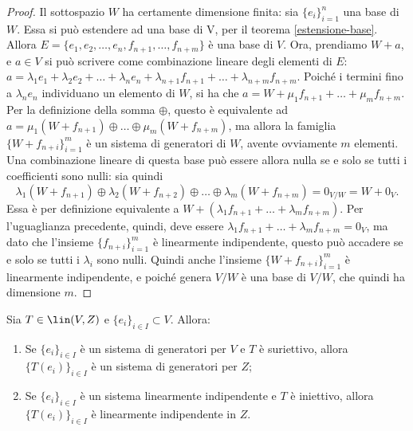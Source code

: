 \begin{proof}
	Il sottospazio $W$ ha certamente dimensione finita: sia $\{  e_i\}_{i=1}^n$ una base di $W$.
	Essa si può estendere ad una base di V, per il teorema \ref{estensione-base}.
	Allora $E=\{  e_1,  e_2,\dots,  e_n,  f_{n+1},\dots,  f_{n+m}\}$ è una base di $V$.
	Ora, prendiamo $W+  a$, e $  a\in V$ si può scrivere come combinazione lineare degli elementi di $E$: $  a=\lambda_1  e_1+\lambda_2  e_2+\dots+\lambda_n  e_n+\lambda_{n+1}  f_{n+1}+\dots+\lambda_{n+m}  f_{n+m}$.
	Poiché i termini fino a $\lambda_n  e_n$ individuano un elemento di $W$, si ha che $a=W+\mu_1  f_{n+1}+\dots+\mu_m  f_{n+m}$.
	Per la definizione della somma $\oplus$, questo è equivalente ad $a=\mu_1(W+  f_{n+1})\oplus\dots\oplus\mu_m(W+  f_{n+m})$, ma allora la famiglia $\{W+  f_{n+i}\}_{i=1}^m$ è un sistema di generatori di $W$, avente ovviamente $m$ elementi.
	Una combinazione lineare di questa base può essere allora nulla se e solo se tutti i coefficienti sono nulli: sia quindi
	\begin{equation*}
		\lambda_1(W+  f_{n+1})\oplus\lambda_2(W+  f_{n+2})\oplus\dots\oplus\lambda_m(W+  f_{n+m})=0_{V/W}=W+0_V.
	\end{equation*}
	Essa è per definizione equivalente a $W+(\lambda_1  f_{n+1}+\dots+\lambda_m  f_{n+m})$.
	Per l'uguaglianza precedente, quindi, deve essere $\lambda_1  f_{n+1}+\dots+\lambda_m  f_{n+m}=0_V$, ma dato che l'insieme $\{  f_{n+i}\}_{i=1}^m$ è linearmente indipendente, questo può accadere se e solo se tutti i $\lambda_i$ sono nulli.
	Quindi anche l'insieme $\{W+  f_{n+i}\}_{i=1}^m$ è linearmente indipendente, e poiché genera $V/W$ è una base di $V/W$, che quindi ha dimensione $m$.
\end{proof}
\begin{teorema}
	Sia $T\in\lin(V,Z)$ e $\{  e_i\}_{i\in I}\subset V$.
	Allora:
	\begin{enumerate}
		\item Se $\{  e_i\}_{i\in I}$ è un sistema di generatori per $V$ e $T$ è suriettivo, allora $\{T(  e_i)\}_{i\in I}$ è un sistema di generatori per $Z$;
		\item Se $\{  e_i\}_{i\in I}$ è un sistema linearmente indipendente e $T$ è iniettivo, allora $\{T(  e_i)\}_{i\in I}$ è linearmente indipendente in $Z$.
	\end{enumerate}
\end{teorema}
